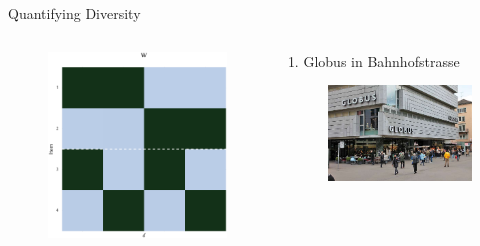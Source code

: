 \documentclass{beamer}
\begin{document}
\begin{frame}{Quantifying Diversity}
  \begin{columns}
    \begin{column}{0.48\textwidth}
      \begin{figure}
        \centering
        \includegraphics[width=\textwidth]{fldc_toy_example_diversity_weights}
      \end{figure}
    \end{column}
    \begin{column}{0.48\textwidth}
      1. Globus in Bahnhofstrasse
      \begin{figure}
        \centering
        \includegraphics[height=.07\textheight]{globus_bahnhof}

\end{figure}
\end{column}
\end{columns}
\end{frame}
\end{document}
